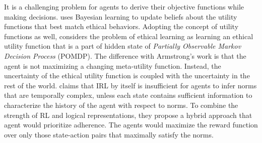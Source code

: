 \documentclass[letterpaper]{article} %
\begin{document}
It is a challenging problem for agents to derive their objective functions while making decisions. \cite{armstrong} uses Bayesian learning to update beliefs about the utility functions that best match ethical behaviors. %
Adopting the concept of utility functions as well, \cite{rledm} considers the problem of ethical learning as learning an ethical utility function that is a part of hidden state of \textit{Partially Observable Markov Decision Process} (POMDP). The difference with Armstrong's work is that the agent is not maximizing a changing meta-utility function. Instead, the uncertainty of the ethical utility function is coupled with the uncertainty in the rest of the world. %
\cite{accountable} claims that IRL by itself is insufficient for agents to infer norms that are temporally complex, unless each state contains sufficient information to characterize the history of the agent with respect to norms. %
To combine the strength of RL and logical representations, they propose a hybrid approach that agent would prioritize adherence. The agents would maximize the reward function over only those state-action pairs that maximally satisfy the norms. %

\end{document}
